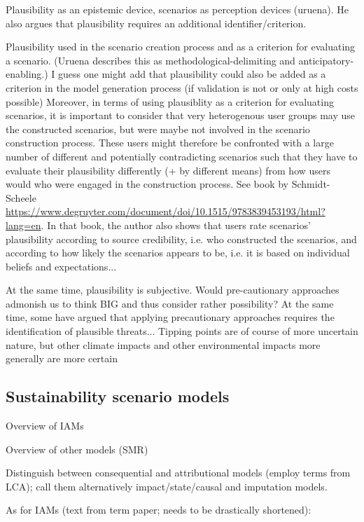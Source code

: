 \documentclass{article}
\begin{document}
\begin{refsection}
Plausibility as an epistemic device, scenarios as perception devices (uruena). He also argues that plausibility requires an additional identifier/criterion.

Plausibility used in the scenario creation process and as a criterion for evaluating a scenario. (Uruena describes this as methodological-delimiting and anticipatory-enabling.) I guess one might add that plausibility could also be added as a criterion in the model generation process (if validation is not or only at high costs possible)
Moreover, in terms of using plausiblity as a criterion for evaluating scenarios, it is important to consider that very heterogenous user groups may use the constructed scenarios, but were maybe not involved in the scenario construction process. These users might therefore be confronted with a large number of different and potentially contradicting scenarios such that they have to evaluate their plausibility differently (+ by different means) from how users would who were engaged in the construction process. See book by Schmidt-Scheele \url{https://www.degruyter.com/document/doi/10.1515/9783839453193/html?lang=en}. In that book, the author also shows that users rate scenarios' plausibility according to source credibility, i.e. who constructed the scenarios, and according to how likely the scenarios appears to be, i.e. it is based on individual beliefs and expectations...

At the same time, plausibility is subjective. Would pre-cautionary approaches admonish us to think BIG and thus consider rather possibility?
At the same time, some have argued that applying precautionary approaches requires the identification of plausible threats...
Tipping points are of course of more uncertain nature, but other climate impacts and other environmental impacts more generally are more certain


\subsection{Sustainability scenario models}
Overview of IAMs

Overview of other models (SMR)

Distinguish between consequential and attributional models (employ terms from LCA); call them alternatively impact/state/causal and imputation models.

As for IAMs (text from term paper; needs to be drastically shortened):


\end{refsection}
\end{document}
